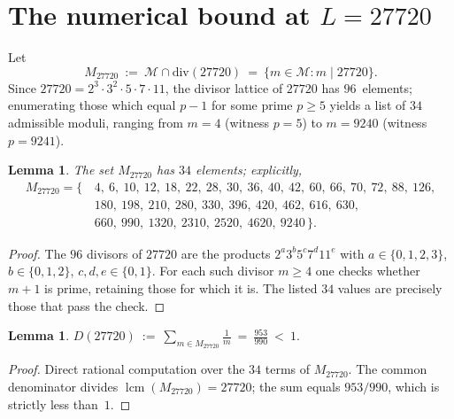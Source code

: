 \documentclass[11pt,a4paper]{article}
\theoremstyle{plain}
\newtheorem{lemma}[theorem]{Lemma}
\theoremstyle{definition}
\theoremstyle{remark}
\begin{document}
\section{The numerical bound at \texorpdfstring{$L = 27720$}{L=27720}}
\label{sec:numerics}

Let
\[
  M_{27720} \ := \ \mathcal{M} \cap \mathrm{div}(27720)
  \ = \ \{ m \in \mathcal{M} : m \mid 27720 \}.
\]
Since $27720 = 2^3 \cdot 3^2 \cdot 5 \cdot 7 \cdot 11$, the
divisor lattice of $27720$ has $96$~elements; enumerating those
which equal $p - 1$ for some prime $p \geq 5$ yields a list of $34$
admissible moduli, ranging from $m = 4$ (witness $p = 5$) to $m =
9240$ (witness $p = 9241$).

\begin{lemma}\label{lem:M27720}
The set $M_{27720}$ has $34$ elements; explicitly,
\begin{align*}
  M_{27720} = \{\,&4,\ 6,\ 10,\ 12,\ 18,\ 22,\ 28,\ 30,\ 36,\ 40,\
                   42,\ 60,\ 66,\ 70,\ 72,\ 88,\ 126,\\
                  & 180,\ 198,\ 210,\ 280,\ 330,\ 396,\ 420,\ 462,\
                   616,\ 630,\\
                  & 660,\ 990,\ 1320,\ 2310,\ 2520,\ 4620,\ 9240\,\}.
\end{align*}
\end{lemma}
\begin{proof}
The $96$ divisors of $27720$ are the products $2^a 3^b 5^c 7^d
11^e$ with $a \in \{0,1,2,3\}$, $b \in \{0,1,2\}$, $c, d, e \in
\{0, 1\}$. For each such divisor $m \geq 4$ one checks whether
$m + 1$ is prime, retaining those for which it is. The listed $34$
values are precisely those that pass the check.
\end{proof}

\begin{lemma}\label{lem:D27720}
$\displaystyle D(27720)\ :=\ \sum_{m \in M_{27720}} \frac{1}{m}\ =\
\frac{953}{990}\ <\ 1.$
\end{lemma}
\begin{proof}
Direct rational computation over the $34$ terms of $M_{27720}$.
The common denominator divides $\operatorname{lcm}(M_{27720}) =
27720$; the sum equals $953/990$, which is strictly less than~$1$.
\end{proof}
\end{document}
